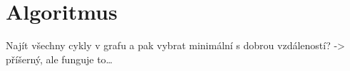 \section{Algoritmus}

Najít všechny cykly v grafu a pak vybrat minimální s dobrou vzdáleností? -> příšerný, ale funguje to\dots